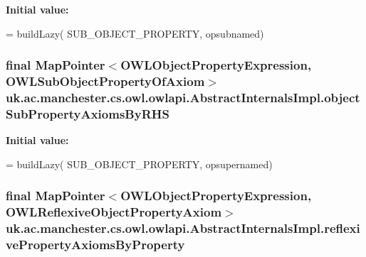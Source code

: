 {\bfseries Initial value\-:}
\begin{DoxyCode}
= buildLazy(
            SUB\_OBJECT\_PROPERTY, opsubnamed)
\end{DoxyCode}
\hypertarget{classuk_1_1ac_1_1manchester_1_1cs_1_1owl_1_1owlapi_1_1_abstract_internals_impl_a43524453e39fff81b9497426c6bc268f}{
\subsubsection[{object\-Sub\-Property\-Axioms\-By\-R\-H\-S}]{\setlength{\rightskip}{0pt plus 5cm}final Map\-Pointer$<${\bf O\-W\-L\-Object\-Property\-Expression}, {\bf O\-W\-L\-Sub\-Object\-Property\-Of\-Axiom}$>$ uk.\-ac.\-manchester.\-cs.\-owl.\-owlapi.\-Abstract\-Internals\-Impl.\-object\-Sub\-Property\-Axioms\-By\-R\-H\-S\hspace{0.3cm}{\ttfamily [protected]}}}\label{classuk_1_1ac_1_1manchester_1_1cs_1_1owl_1_1owlapi_1_1_abstract_internals_impl_a43524453e39fff81b9497426c6bc268f}
{\bfseries Initial value\-:}
\begin{DoxyCode}
= buildLazy(
            SUB\_OBJECT\_PROPERTY, opsupernamed)
\end{DoxyCode}
\hypertarget{classuk_1_1ac_1_1manchester_1_1cs_1_1owl_1_1owlapi_1_1_abstract_internals_impl_a8b3dd3d7dbdb009140c163ba282463ab}{
\subsubsection[{reflexive\-Property\-Axioms\-By\-Property}]{\setlength{\rightskip}{0pt plus 5cm}final Map\-Pointer$<${\bf O\-W\-L\-Object\-Property\-Expression}, {\bf O\-W\-L\-Reflexive\-Object\-Property\-Axiom}$>$ uk.\-ac.\-manchester.\-cs.\-owl.\-owlapi.\-Abstract\-Internals\-Impl.\-reflexive\-Property\-Axioms\-By\-Property\hspace{0.3cm}{\ttfamily [protected]}}}\label{classuk_1_1ac_1_1manchester_1_1cs_1_1owl_1_1owlapi_1_1_abstract_internals_impl_a8b3dd3d7dbdb009140c163ba282463ab}
